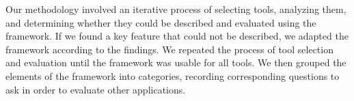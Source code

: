 \documentclass{sigchi}
\begin{document}
{Our methodology involved an iterative process of selecting tools, analyzing them, and determining whether they could be described and evaluated using the framework. If we found a key feature that could not be described, we adapted the framework according to the findings. We repeated the process of tool selection and evaluation until the framework was usable for all tools. We then grouped the elements of the framework into categories, recording corresponding questions to ask in order to evaluate other applications. 
%

\begin{table}[htbp]
\small
\begin{tabular}{|p{}| p{}| p{}|}


\end{tabular}
\end{table}}
\end{document}
